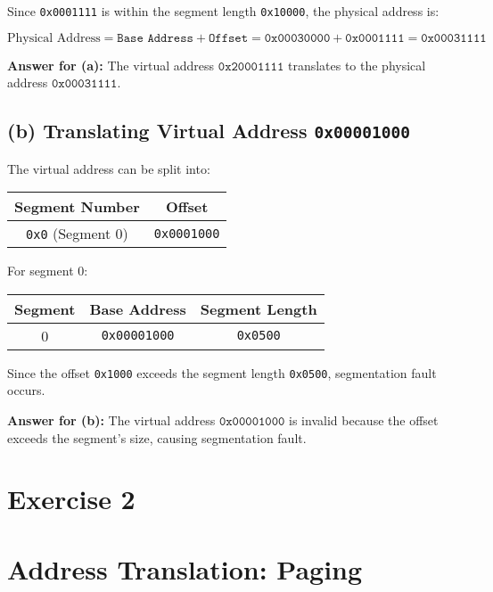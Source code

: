 \documentclass{article}
\newcommand{\exercise}[1]{
    \section*{Exercise #1}
    \markboth{Exercise #1}{}
}
\begin{document}
Since \texttt{0x0001111} is within the segment length \texttt{0x10000},
the physical address is:

\[
\text{Physical Address} = \texttt{Base Address} + \texttt{Offset} = \texttt{0x00030000} + \texttt{0x0001111} = \texttt{0x00031111}
\]

\bigskip
\textbf{Answer for (a):} The virtual address \(\texttt{0x20001111}\)
translates to the physical address \(\texttt{0x00031111}\).





\newpage
\subsection*{(b) Translating Virtual Address \texttt{0x00001000}}

The virtual address can be split into:

\begin{center}
\begin{tabular}{|c|c|}
\hline
\textbf{Segment Number} & \textbf{Offset} \\
\hline
\texttt{0x0} (Segment 0) & \texttt{0x0001000} \\
\hline
\end{tabular}
\end{center}

For segment 0:

\begin{center}
\begin{tabular}{|c|c|c|}
\hline
\textbf{Segment} & \textbf{Base Address} & \textbf{Segment Length} \\
\hline
0 & \texttt{0x00001000} & \texttt{0x0500} \\
\hline
\end{tabular}
\end{center}

Since the offset \texttt{0x1000} exceeds the segment length \texttt{0x0500},
 segmentation fault occurs.

\bigskip
\textbf{Answer for (b):} The virtual address \(\texttt{0x00001000}\)
is invalid because the offset exceeds the segment’s size,
causing segmentation fault.







\newpage
\exercise{2}

\section*{Address Translation: Paging}
\end{document}
